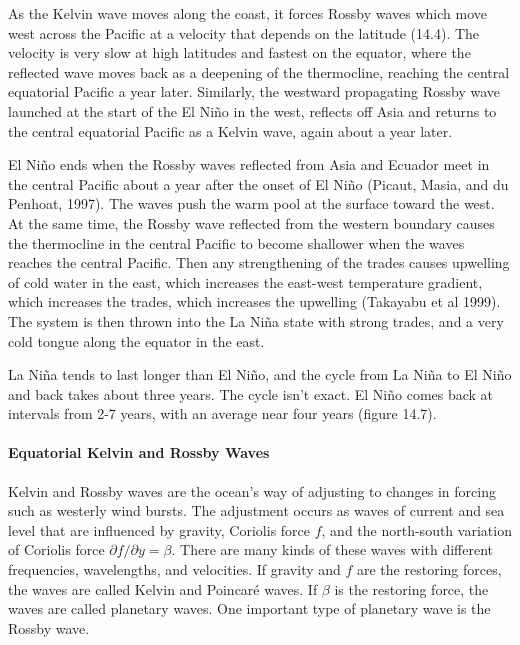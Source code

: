 As the Kelvin wave moves along the coast, it
forces Rossby waves which move west across the Pacific at a velocity
that depends on the latitude (14.4). The velocity is very slow at high
latitudes and fastest on the equator, where the reflected wave moves
back as a deepening of the thermocline,
reaching the central equatorial Pacific a year later. Similarly, the
westward propagating Rossby wave launched at the
start of the El Ni\~{n}o in the west, reflects off Asia and returns to
the central equatorial Pacific as a Kelvin wave, again about a year
later.

El Ni\~{n}o ends when the Rossby waves reflected from Asia and Ecuador
meet in the central Pacific about a year after the onset of El
Ni\~{n}o (Picaut, Masia, and du Penhoat, 1997). The waves push the
warm pool at the surface toward the west. At the same time, the
Rossby wave reflected from the western boundary
causes the thermocline in the central
Pacific to become shallower when the waves reaches the central
Pacific. Then any strengthening of the trades causes
upwelling of cold water in the east, which
increases the east-west temperature gradient, which increases the
trades, which increases the upwelling (Takayabu et al 1999). The
system is then thrown into the La Ni\~{n}a state with strong trades,
and a very cold tongue along the equator in the east.

La Ni\~{n}a tends to last longer than El Ni\~{n}o, and the cycle from
La Ni\~{n}a to El Ni\~{n}o and back takes about three years. The cycle
isn't exact. El Ni\~{n}o comes back at intervals from 2-7 years, with
an average near four years (figure 14.7).

\paragraph{Equatorial Kelvin and Rossby Waves}
Kelvin and Rossby waves are the ocean's way of
adjusting to changes in forcing such as westerly wind bursts. The
adjustment occurs as waves of current and sea level that are
influenced by gravity, Coriolis force $f$, and the north-south
variation of Coriolis force $\partial f/\partial y = \beta$. There are
many kinds of these waves with different frequencies, wavelengths, and
velocities. If gravity and $f$ are the restoring forces, the waves are
called Kelvin and Poincar\'{e} waves. If $\beta $ is the restoring
force, the waves are called planetary waves. One important type of
planetary wave is the Rossby wave.

